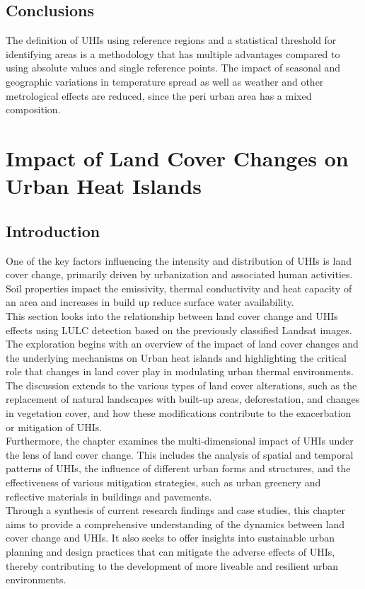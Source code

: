 \documentclass[12pt,a4paper, english,twoside]{article}
\begin{document}
    \subsection{Conclusions}
    The definition of \glspl{UHI} using reference regions and a statistical threshold for identifying areas is a methodology that has multiple advantages compared to using absolute values and single reference points. 
    The impact of seasonal and geographic variations in temperature spread as well as weather and other metrological effects are reduced, since the peri urban area has a mixed composition. 

\newpage
\section{Impact of Land Cover Changes on Urban Heat Islands}\label{sec:LULC}
    \subsection{Introduction}
      One of the key factors influencing the intensity and distribution of \glspl{UHI} is land cover change, primarily driven by urbanization and associated human activities.
      Soil properties impact the emissivity, thermal conductivity and heat capacity of an area and increases in build up reduce surface water availability. 
      \\    
      This section looks into the relationship between land cover change and \glspl{UHI} effects using \gls{LULC} detection based on the previously classified Landsat images.
      The exploration begins with an overview of the impact of land cover changes and the underlying mechanisms on Urban heat islands and highlighting the critical role that changes in land cover play in modulating urban thermal environments.
      The discussion extends to the various types of land cover alterations, such as the replacement of natural landscapes with built-up areas, deforestation, and changes in vegetation cover, and how these modifications contribute to the exacerbation or mitigation of \glspl{UHI}.
      \\
      Furthermore, the chapter examines the multi-dimensional impact of \glspl{UHI} under the lens of land cover change.
      This includes the analysis of spatial and temporal patterns of \glspl{UHI}, the influence of different urban forms and structures, and the effectiveness of various mitigation strategies, such as urban greenery and reflective materials in buildings and pavements.
      \\
      Through a synthesis of current research findings and case studies, this chapter aims to provide a comprehensive understanding of the dynamics between land cover change and \glspl{UHI}.
      It also seeks to offer insights into sustainable urban planning and design practices that can mitigate the adverse effects of \glspl{UHI}, thereby contributing to the development of more liveable and resilient urban environments.
%
\end{document}
